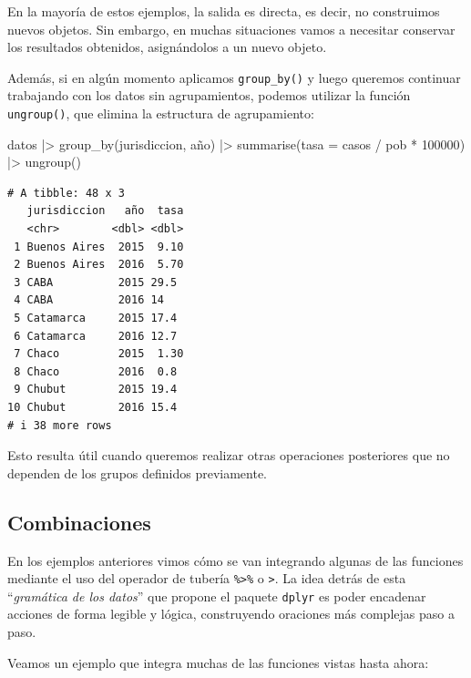 \documentclass[
  spanish,
  letterpaper,
  DIV=11,
  numbers=noendperiod]{scrreprt}
\newenvironment{Shaded}{\begin{snugshade}}{\end{snugshade}}
\newcommand{\AttributeTok}[1]{\textcolor[rgb]{0.40,0.45,0.13}{#1}}
\newcommand{\DecValTok}[1]{\textcolor[rgb]{0.68,0.00,0.00}{#1}}
\newcommand{\FunctionTok}[1]{\textcolor[rgb]{0.28,0.35,0.67}{#1}}
\newcommand{\NormalTok}[1]{\textcolor[rgb]{0.00,0.23,0.31}{#1}}
\newcommand{\SpecialCharTok}[1]{\textcolor[rgb]{0.37,0.37,0.37}{#1}}
\begin{document}
En la mayoría de estos ejemplos, la salida es directa, es decir, no
construimos nuevos objetos. Sin embargo, en muchas situaciones vamos a
necesitar conservar los resultados obtenidos, asignándolos a un nuevo
objeto.

Además, si en algún momento aplicamos \texttt{group\_by()} y luego
queremos continuar trabajando con los datos sin agrupamientos, podemos
utilizar la función \texttt{ungroup()}, que elimina la estructura de
agrupamiento:

\begin{Shaded}
\begin{Highlighting}[]
\NormalTok{datos }\SpecialCharTok{|\textgreater{}}
  \FunctionTok{group\_by}\NormalTok{(jurisdiccion, año) }\SpecialCharTok{|\textgreater{}}
  \FunctionTok{summarise}\NormalTok{(}\AttributeTok{tasa =}\NormalTok{ casos }\SpecialCharTok{/}\NormalTok{ pob }\SpecialCharTok{*} \DecValTok{100000}\NormalTok{) }\SpecialCharTok{|\textgreater{}}
  \FunctionTok{ungroup}\NormalTok{()}
\end{Highlighting}
\end{Shaded}

\begin{verbatim}
# A tibble: 48 x 3
   jurisdiccion   año  tasa
   <chr>        <dbl> <dbl>
 1 Buenos Aires  2015  9.10
 2 Buenos Aires  2016  5.70
 3 CABA          2015 29.5 
 4 CABA          2016 14   
 5 Catamarca     2015 17.4 
 6 Catamarca     2016 12.7 
 7 Chaco         2015  1.30
 8 Chaco         2016  0.8 
 9 Chubut        2015 19.4 
10 Chubut        2016 15.4 
# i 38 more rows
\end{verbatim}

Esto resulta útil cuando queremos realizar otras operaciones posteriores
que no dependen de los grupos definidos previamente.

\subsection{Combinaciones}\label{combinaciones}

En los ejemplos anteriores vimos cómo se van integrando algunas de las
funciones mediante el uso del operador de tubería
\texttt{\%\textgreater{}\%} o \texttt{\textbar{}\textgreater{}}. La idea
detrás de esta ``\emph{gramática de los datos}'' que propone el paquete
\texttt{dplyr} es poder encadenar acciones de forma legible y lógica,
construyendo oraciones más complejas paso a paso.

Veamos un ejemplo que integra muchas de las funciones vistas hasta
ahora:
\end{document}
